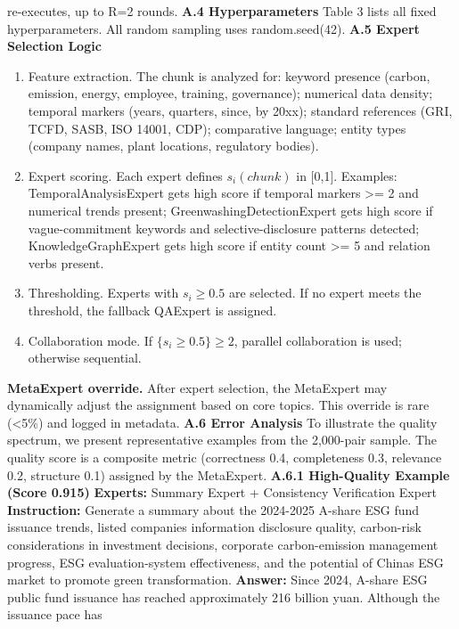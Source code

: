 \documentclass[9pt,twocolumn]{extarticle}
\begin{document}
re-executes, up to R=2 rounds.
\textbf{A.4 Hyperparameters}
Table 3 lists all fixed hyperparameters. All random sampling uses
random.seed(42).
\textbf{A.5 Expert Selection Logic}
\begin{enumerate}
\def\labelenumi{\arabic{enumi}.}
\item
  Feature extraction. The chunk is analyzed for: keyword presence
  (carbon, emission, energy, employee, training, governance); numerical
  data density; temporal markers (years, quarters, since, by 20xx);
  standard references (GRI, TCFD, SASB, ISO 14001, CDP); comparative
  language; entity types (company names, plant locations, regulatory
  bodies).
\item
  Expert scoring. Each expert defines \(s_{i}(chunk)\) in [0,1].
  Examples: TemporalAnalysisExpert gets high score if temporal markers
  \textgreater= 2 and numerical trends present;
  GreenwashingDetectionExpert gets high score if vague-commitment
  keywords and selective-disclosure patterns detected;
  KnowledgeGraphExpert gets high score if entity count \textgreater= 5
  and relation verbs present.
\item
  Thresholding. Experts with \(s_{i} \geq 0.5\) are selected. If no
  expert meets the threshold, the fallback QAExpert is assigned.
\item
  Collaboration mode. If $\{s_i \geq 0.5\} \geq 2$,
  parallel collaboration is used; otherwise sequential.
\end{enumerate}
\textbf{MetaExpert override.} After expert selection, the MetaExpert may
dynamically adjust the assignment based on core topics. This override is
rare (\textless5\%) and logged in metadata.
\textbf{A.6 Error Analysis}
To illustrate the quality spectrum, we present representative examples
from the 2,000-pair sample. The quality score is a composite metric
(correctness 0.4, completeness 0.3, relevance 0.2, structure 0.1)
assigned by the MetaExpert.
\textbf{A.6.1 High-Quality Example (Score 0.915)}
\textbf{Experts:} Summary Expert + Consistency Verification Expert
\textbf{Instruction:} Generate a summary about the 2024-2025 A-share ESG
fund issuance trends, listed companies\textquotesingle{} information
disclosure quality, carbon-risk considerations in investment decisions,
corporate carbon-emission management progress, ESG evaluation-system
effectiveness, and the potential of China\textquotesingle s ESG market
to promote green transformation.
\textbf{Answer:} Since 2024, A-share ESG public fund issuance has
reached approximately 216 billion yuan. Although the issuance pace has
\end{document}
